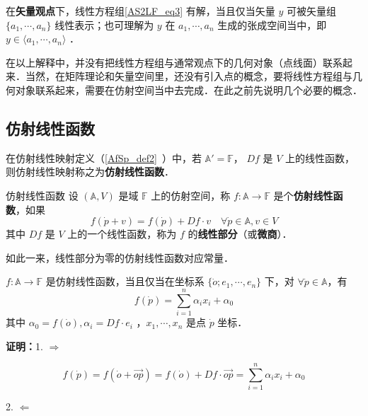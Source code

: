 在\textbf{矢量观点}下，线性方程组\autoref{AS2LF_eq3} 有解，当且仅当矢量 $y$ 可被矢量组 $\{a_1,\cdots,a_n\}$ 线性表示；也可理解为 $y$ 在 $a_1,\cdots,a_n$ 生成的张成空间当中，即$y\in\langle a_1,\cdots,a_n\rangle$ ．

在以上解释中，并没有把线性方程组与通常观点下的几何对象（点线面）联系起来．当然，在矩阵理论和矢量空间里，还没有引入点的概念，要将线性方程组与几何对象联系起来，需要在仿射空间当中去完成．在此之前先说明几个必要的概念．
\subsection{仿射线性函数}
在仿射线性映射定义（\autoref{AfSp_def2}~）中，若 $\mathbb A'=\mathbb F$， $Df$ 是 $V$ 上的线性函数，则仿射线性映射称之为\textbf{仿射线性函数}．
\begin{definition}{仿射线性函数}
设 $(\mathbb A,V)$ 是域 $\mathbb {F}$ 上的仿射空间，称 $f:\mathbb A\rightarrow \mathbb F$ 是个\textbf{仿射线性函数}，如果
\begin{equation}
f(\dot p+v)=f(\dot p)+Df\cdot v\quad\forall \dot p\in\mathbb A,v\in V
\end{equation}
其中 $Df$ 是 $V$ 上的一个线性函数，称为 $f$ 的\textbf{线性部分}（或\textbf{微商}）．
\end{definition}
如此一来，线性部分为零的仿射线性函数对应常量．
\begin{theorem}{}
 $f:\mathbb A\rightarrow \mathbb F$ 是仿射线性函数，当且仅当在坐标系 $\{\dot o;e_1,\cdots,e_n\}$ 下，对 $\forall \dot p\in \mathbb A$，有
 \begin{equation}
 f(\dot p)=\sum_{i=1}^n\alpha_ix_i+\alpha_0
 \end{equation}
 其中 $\alpha_0=f(\dot o),\alpha_i=Df\cdot e_i$ ，$x_1,\cdots,x_n$ 是点 $\dot p$ 坐标．
\end{theorem}
\textbf{证明：}1. $\Rightarrow$

\begin{equation}
f(\dot p)=f(\dot o+\vec{op})=f(\dot o)+Df\cdot \vec{op}=\sum_{i=1}^n \alpha_i x_i+\alpha_0
\end{equation}

2. $\Leftarrow$

